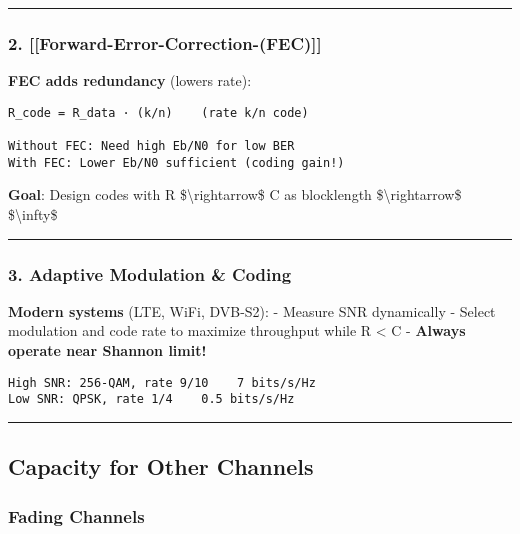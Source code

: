 \begin{center}\rule{0.5\linewidth}{0.5pt}\end{center}

\subsubsection{2.
{[}{[}Forward-Error-Correction-(FEC){]}{]}}\label{forward-error-correction-fec}

\textbf{FEC adds redundancy} (lowers rate):

\begin{verbatim}
R_code = R_data · (k/n)    (rate k/n code)

Without FEC: Need high Eb/N0 for low BER
With FEC: Lower Eb/N0 sufficient (coding gain!)
\end{verbatim}

\textbf{Goal}: Design codes with R \$\textbackslash rightarrow\$ C as
blocklength \$\textbackslash rightarrow\$ \$\textbackslash infty\$

\begin{center}\rule{0.5\linewidth}{0.5pt}\end{center}

\subsubsection{3. Adaptive Modulation \&
Coding}\label{adaptive-modulation-coding}

\textbf{Modern systems} (LTE, WiFi, DVB-S2): - Measure SNR dynamically -
Select modulation and code rate to maximize throughput while R
\textless{} C - \textbf{Always operate near Shannon limit!}

\begin{verbatim}
High SNR: 256-QAM, rate 9/10    7 bits/s/Hz
Low SNR: QPSK, rate 1/4    0.5 bits/s/Hz
\end{verbatim}

\begin{center}\rule{0.5\linewidth}{0.5pt}\end{center}

\subsection{\texorpdfstring{ Capacity for Other
Channels}{ Capacity for Other Channels}}\label{capacity-for-other-channels}

\subsubsection{Fading Channels}\label{fading-channels}

